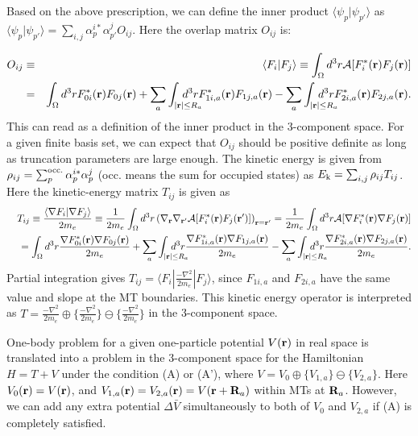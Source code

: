 \documentclass[a4paper,10pt,aip,onecolumn,amsmath,amssymb,floatfix,rmp]{revtex4-1}
\newcommand{\bfr}{{\bf r}}
\newcommand{\bfR}{{\bf R}}
\def\calR{{\cal A}}
\def\inta{\int_{|\bfr|\leq R_a}\!\!\!\!\!\!\!\!\!\!\!\!}
\def\ek{E_{\rm k}}
\begin{document}
\begin{widetext}
Based on the above prescription, we can define the inner product 
$\langle \psi_p |\psi_{p'} \rangle$ as $\langle \psi_p |\psi_{p'}
\rangle=\sum_{i,j}\alpha_{p}^{i*}\alpha_{p'}^{j}O_{ij}$.
Here the overlap matrix  $O_{ij}$ is:
\begin{widetext}
\begin{eqnarray}
O_{ij} &\equiv& \langle F_i|F_{j} \rangle \equiv \int_\Omega d^3r 
  \calR[F^*_i(\bfr)F_j(\bfr)] \nonumber \\
&=&\int_\Omega d^3r  F^*_{0i}(\bfr)F_{0j}(\bfr)
  + \sum_a \inta d^3r  F^*_{1i,a}(\bfr)F_{1j,a}(\bfr) 
  - \sum_a \inta d^3r  F^*_{2i,a}(\bfr)F_{2j,a}(\bfr).  \label{eq:norm} 
\end{eqnarray}
This can read as a definition of the inner product in the 3-component space.
For a given finite basis set, we can expect that $O_{ij}$ should be
positive definite as long as truncation parameters are large enough.
The kinetic energy is given 
from $\rho_{ij}=\sum_{p}^{\rm occ.} \alpha^{i*}_p \alpha^j_p$ (occ. means
the sum for occupied states) as $\ek=\sum_{i,j} \rho_{ij} T_{ij}$.
Here the kinetic-energy matrix $T_{ij}$ is given as
\begin{eqnarray}
&&T_{ij}\equiv \frac{\langle \nabla F_i| \nabla F_{j} \rangle}{2m_e}
 \equiv \frac{1}{2m_e} \int_\Omega d^3r \left(\nabla_\bfr \nabla_{\bfr'}
 \calR[F^*_i(\bfr)F_j(\bfr')]\right)_{\bfr=\bfr'} 
=\frac{1}{2m_e} \int_\Omega d^3r 
\calR[\nabla F^*_i(\bfr) \nabla F_j(\bfr)] \nonumber \\
&&= \int_\Omega d^3r \frac{\nabla F^*_{0i}(\bfr) \nabla F_{0j}(\bfr)}{2m_e} 
+ \sum_a \inta d^3r \frac{\nabla F^*_{1i,a}(\bfr) \nabla F_{1j,a}(\bfr)}{2m_e}
- \sum_a \inta d^3r \frac{\nabla F^*_{2i,a}(\bfr) \nabla F_{2j,a}(\bfr)}{2m_e}.
\label{eq:kin}
\end{eqnarray}
Partial integration gives $T_{ij}= \langle F_i| \frac{-\nabla^2 }{2m_e}|F_{j} \rangle$, 
since $F_{1i,a}$ and $F_{2i,a}$ have the same value and slope at the MT boundaries.
This kinetic energy operator is interpreted as $T=\frac{-\nabla^2 }{2m_e} \oplus
\{\frac{-\nabla^2 }{2m_e} \} \ominus  \{\frac{-\nabla^2 }{2m_e} \}$ in the 3-component space.

One-body problem for a given one-particle potential $V(\bfr)$ in real
space is translated into a problem in the 3-component space for the
Hamiltonian $H=T+V$ under the condition (A) or (A'), where $V=V_0 \oplus
\{V_{1,a}\} \ominus \{V_{2,a}\}$.  Here $V_0(\bfr)=V(\bfr)$, and
$V_{1,a}(\bfr)=V_{2,a}(\bfr)=V(\bfr+\bfR_a)$ within MTs at
$\bfR_a$. However, we can add any extra potential $\Delta \bar{V}$
simultaneously to both of $V_0$ and $V_{2,a}$ if (A) is completely
satisfied.


\end{widetext}
\end{widetext}
\end{document}
